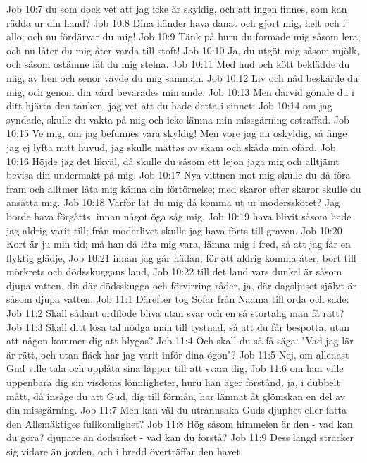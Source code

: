 Job 10:7  du som dock vet att jag icke är skyldig, och att ingen finnes, som kan rädda ur din hand?
Job 10:8  Dina händer hava danat och gjort mig, helt och i allo; och nu fördärvar du mig!
Job 10:9  Tänk på huru du formade mig såsom lera; och nu låter du mig åter varda till stoft!
Job 10:10  Ja, du utgöt mig såsom mjölk, och såsom ostämne lät du mig stelna.
Job 10:11  Med hud och kött beklädde du mig, av ben och senor vävde du mig samman.
Job 10:12  Liv och nåd beskärde du mig, och genom din vård bevarades min ande.
Job 10:13  Men därvid gömde du i ditt hjärta den tanken, jag vet att du hade detta i sinnet:
Job 10:14  om jag syndade, skulle du vakta på mig och icke lämna min missgärning ostraffad.
Job 10:15  Ve mig, om jag befunnes vara skyldig! Men vore jag än oskyldig, så finge jag ej lyfta mitt huvud, jag skulle mättas av skam och skåda min ofärd.
Job 10:16  Höjde jag det likväl, då skulle du såsom ett lejon jaga mig och alltjämt bevisa din undermakt på mig.
Job 10:17  Nya vittnen mot mig skulle du då föra fram och alltmer låta mig känna din förtörnelse; med skaror efter skaror skulle du ansätta mig.
Job 10:18  Varför lät du mig då komma ut ur modersskötet? Jag borde hava förgåtts, innan något öga såg mig,
Job 10:19  hava blivit såsom hade jag aldrig varit till; från moderlivet skulle jag hava förts till graven.
Job 10:20  Kort är ju min tid; må han då låta mig vara, lämna mig i fred, så att jag får en flyktig glädje,
Job 10:21  innan jag går hädan, för att aldrig komma åter, bort till mörkrets och dödsskuggans land,
Job 10:22  till det land vars dunkel är såsom djupa vatten, dit där dödsskugga och förvirring råder, ja, där dagsljuset självt är såsom djupa vatten.
Job 11:1  Därefter tog Sofar från Naama till orda och sade:
Job 11:2  Skall sådant ordflöde bliva utan svar och en så stortalig man få rätt?
Job 11:3  Skall ditt lösa tal nödga män till tystnad, så att du får bespotta, utan att någon kommer dig att blygas?
Job 11:4  Och skall du så få säga: "Vad jag lär är rätt, och utan fläck har jag varit inför dina ögon"?
Job 11:5  Nej, om allenast Gud ville tala och upplåta sina läppar till att svara dig,
Job 11:6  om han ville uppenbara dig sin visdoms lönnligheter, huru han äger förstånd, ja, i dubbelt mått, då insåge du att Gud, dig till förmån, har lämnat åt glömskan en del av din missgärning.
Job 11:7  Men kan väl du utrannsaka Guds djuphet eller fatta den Allsmäktiges fullkomlighet?
Job 11:8  Hög såsom himmelen är den - vad kan du göra? djupare än dödsriket - vad kan du förstå?
Job 11:9  Dess längd sträcker sig vidare än jorden, och i bredd överträffar den havet.
